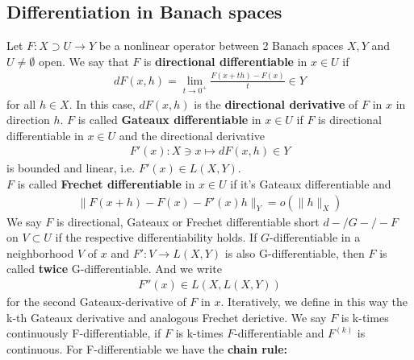 \subsection{Differentiation in Banach spaces}
Let $F: X \supset U \rightarrow Y$ be a nonlinear operator between 2 Banach spaces $X, Y$ and $U \neq \emptyset$ open. We say that $F$ is \textbf{directional differentiable} in $x \in U$ if 
\begin{align*}
	dF(x, h) = \lim_{t \rightarrow 0^+} \frac{F(x + th) - F(x)}{t} \in Y
\end{align*}
for all $h \in X$. In this case, $dF(x, h)$ is the \textbf{directional derivative} of $F$ in $x$ in direction $h$. $F$ is called \textbf{Gateaux differentiable} in $x \in U$ if $F$ is directional differentiable in $x \in U$ and the directional derivative 
\begin{align*}
	F'(x): X \ni x \mapsto dF(x,h) \in Y
\end{align*}
is bounded and linear, i.e. $F'(x) \in L(X, Y)$. \\
$F$ is called \textbf{Frechet differentiable} in $x \in U$ if it's Gateaux differentiable and 
\begin{align*}
	\|F(x + h) - F(x) - F'(x) h\|_Y = o(\|h\|_X)
\end{align*}
We say $F$ is directional, Gateaux or Frechet differentiable short $d- \slash G- \slash - F$ on $V \subset U$ if the respective differentiability holds. If $G$-differentiable in a neighborhood $V$ of $x$ and $F': V \rightarrow L(X, Y)$ is also G-differentiable, then $F$ is called \textbf{twice} G-differentiable. And we write 
\begin{align*}
	F''(x) \in L(X, L(X, Y))
\end{align*}
for the second Gateaux-derivative of $F$ in $x$. Iteratively, we define in this way the k-th Gateaux derivative and analogous Frechet derictive. We say $F$ is k-times continuously F-differentiable, if $F$ is k-times $F$-differentiable and $F^(k)$ is continuous. For F-differentiable we have the \textbf{chain rule:}
